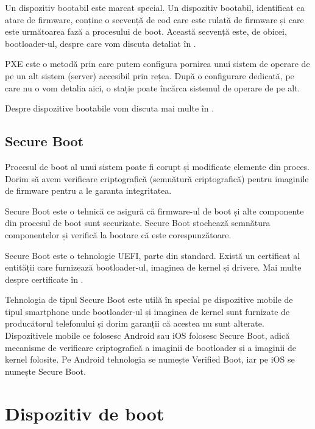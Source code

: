 Un dispozitiv bootabil este marcat special. Un dispozitiv bootabil, identificat
ca atare de firmware, conține o secvență de cod care este rulată de firmware și
care este următoarea fază a procesului de boot. Această secvență este, de
obicei, bootloader-ul, despre care vom discuta detaliat în
.

PXE este o metodă prin care putem configura pornirea unui sistem de operare de
pe un alt sistem (server) accesibil prin rețea. După o configurare dedicată, pe
care nu o vom detalia aici, o stație poate încărca sistemul de operare de pe
alt.

Despre dispozitive bootabile vom discuta mai multe în
.

\subsection{Secure Boot}
\label{sec:boot-firmware-secureboot}

Procesul de boot al unui sistem poate fi corupt și modificate elemente din
proces. Dorim să avem verificare criptografică (semnătură criptografică) pentru
imaginile de firmware pentru a le garanta integritatea.

Secure Boot este o tehnică ce asigură că firmware-ul de boot și alte componente
din procesul de boot sunt securizate. Secure Boot stochează semnătura
componentelor și verifică la bootare că este corespunzătoare.

Secure Boot este o tehnologie UEFI, parte din standard. Există un certificat al
entității care furnizează bootloader-ul, imaginea de kernel și drivere. Mai
multe despre certificate în .

Tehnologia de tipul Secure Boot este utilă în special pe dispozitive mobile de
tipul smartphone unde bootloader-ul și imaginea de kernel sunt furnizate de
producătorul telefonului și dorim garanții că acestea nu sunt alterate.
Dispozitivele mobile ce folosesc Android sau iOS folosesc Secure Boot, adică
mecanisme de verificare criptografică a imaginii de bootloader și a imaginii de
kernel folosite. Pe Android tehnologia se numește Verified Boot, iar pe iOS se
numește Secure Boot.

\section{Dispozitiv de boot}
\label{sec:boot-bootdev}

